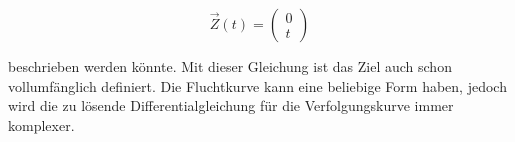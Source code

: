 \begin{equation}
    \vec{Z}(t)
    =
    \left( \begin{array}{c} 0 \\  t \end{array} \right)
\end{equation}

beschrieben werden könnte.
Mit dieser Gleichung ist das Ziel auch schon vollumfänglich definiert.
Die Fluchtkurve kann eine beliebige Form haben, jedoch wird die zu lösende Differentialgleichung für die Verfolgungskurve immer komplexer.





